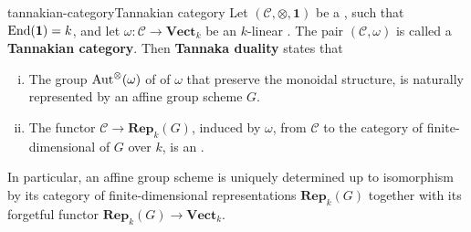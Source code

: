 \begin{topic}{tannakian-category}{Tannakian category}
    Let $(\mathcal{C}, \otimes, \textbf{1})$ be a    , such that $\textup{End}(\textbf{1}) = k$, and let $\omega : \mathcal{C} \to \textbf{Vect}_k$ be an   $k$-linear  . The pair $(\mathcal{C}, \omega)$ is called a \textbf{Tannakian category}. Then \textbf{Tannaka duality} states that
    \begin{enumerate}[(i)]
        \item The group $\textup{Aut}^\otimes(\omega)$ of  of $\omega$ that preserve the monoidal structure, is naturally represented by an affine group scheme $G$.
        \item The functor $\mathcal{C} \to \textbf{Rep}_k(G)$, induced by $\omega$, from $\mathcal{C}$ to the category of finite-dimensional  of $G$ over $k$, is an .
    \end{enumerate}
    In particular, an affine group scheme is uniquely determined up to isomorphism by its category of finite-dimensional representations $\textbf{Rep}_k(G)$ together with its forgetful functor $\textbf{Rep}_k(G) \to \textbf{Vect}_k$.
\end{topic}

